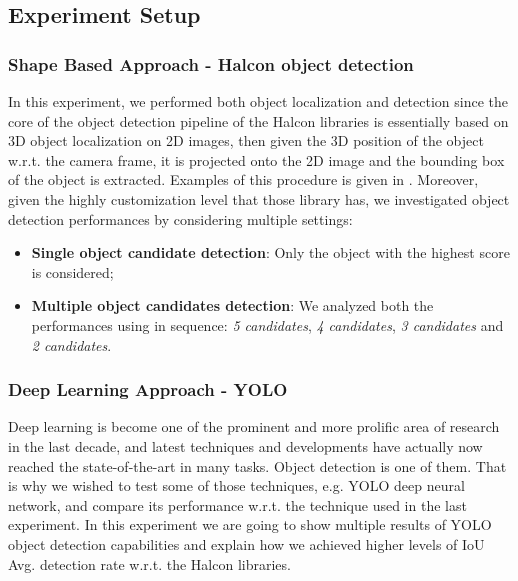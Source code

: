 \subsection{Experiment Setup}

\subsubsection{Shape Based Approach - Halcon object detection}\label{subsec:halcon_obj_det_results}

In this experiment, we performed both object localization and detection since the core of the object detection pipeline of the Halcon libraries is essentially based on 3D object localization on 2D images, then given the 3D position of the object w.r.t. the camera frame, it is projected onto the 2D image and the bounding box of the object is extracted. Examples of this procedure is given in . Moreover, given the highly customization level that those library has, we investigated object detection performances by considering multiple settings:

\begin{itemize}
	\item \textbf{Single object candidate detection}: Only the object with the highest score is considered;
	\item \textbf{Multiple object candidates detection}: We analyzed both the performances using in sequence: \emph{5 candidates}, \emph{4 candidates}, \emph{3 candidates} and \emph{2 candidates}.
\end{itemize}


\subsubsection{Deep Learning Approach - YOLO}\label{subsec:yolo_obj_det_details}

Deep learning is become one of the prominent and more prolific area of research in the last decade, and latest techniques and developments have actually now reached the state-of-the-art in many tasks. Object detection is one of them. That is why we wished to test some of those techniques, e.g. YOLO deep neural network, and compare its performance w.r.t. the technique used in the last experiment. In this experiment we are going to show multiple results of YOLO object detection capabilities and explain how we achieved higher levels of IoU Avg. detection rate w.r.t. the Halcon libraries.

